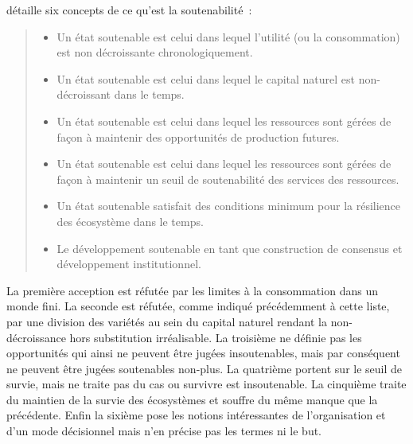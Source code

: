 \citeauthor*{perman_natural_2009}
détaille six concepts de ce qu'est la soutenabilité~:
\label{6concepts_soutenabilité}
\blockcquote[Traduction. Table 4.2 Six concepts of sustainability]{perman_natural_2009}{
\begin{itemize}
\item Un état soutenable est celui dans lequel l'utilité (ou la consommation) est non décroissante chronologiquement.
\item Un état soutenable est celui dans lequel le capital naturel est non-décroissant dans le temps.
\item Un état soutenable est celui dans lequel les ressources sont gérées de façon à maintenir des opportunités de production futures.
\item Un état soutenable est celui dans lequel les ressources sont gérées de façon à maintenir un seuil de soutenabilité des services des ressources.
\item Un état soutenable satisfait des conditions minimum pour la résilience des écosystème dans le temps.
\item Le développement soutenable en tant que construction de consensus et développement institutionnel.
\end{itemize}}

La première acception est réfutée par les limites à la consommation dans un monde fini.
La seconde est réfutée, comme indiqué précédemment à cette liste, par une division des variétés au sein du capital naturel rendant la non-décroissance hors substitution irréalisable.
La troisième ne définie pas les opportunités qui ainsi ne peuvent être jugées insoutenables, mais par conséquent ne peuvent être jugées soutenables non-plus.
La quatrième portent sur le seuil de survie, mais ne traite pas du cas ou survivre est insoutenable.
La cinquième traite du maintien de la survie des écosystèmes et souffre du même manque que la précédente.
Enfin la sixième pose les notions intéressantes de l'organisation et d'un mode décisionnel mais n'en précise pas les termes ni le but. 

